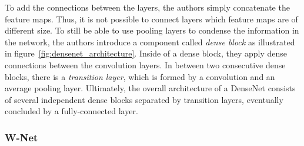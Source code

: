 To add the connections between the layers, the authors simply concatenate the feature maps. Thus, it is not possible to connect layers which feature maps are of different size. To still be able to use pooling layers to condense the information in the network, the authors introduce a component called \emph{dense block} as illustrated in figure~\ref{fig:densenet_architecture}. Inside of a dense block, they apply dense connections between the convolution layers. In between two consecutive dense blocks, there is a \emph{transition layer}, which is formed by a convolution and an average pooling layer. Ultimately, the overall architecture of a DenseNet consists of several independent dense blocks separated by transition layers, eventually concluded by a fully-connected layer.

\subsubsection{W-Net}
\label{sec:w-net}

